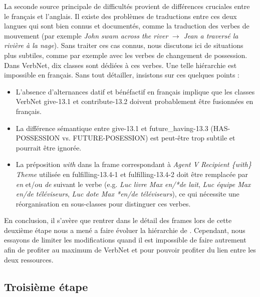 La seconde source principale de difficultés provient de différences cruciales
entre le français et l'anglais. Il existe des problèmes de traductions entre
ces deux langues qui sont bien connus et documentés, comme la traduction des
verbes de mouvement (par exemple \emph{John swam across the river}
$\rightarrow$ \emph{Jean a traversé la rivière à la nage}). Sans traiter ces
cas connus, nous discutons ici de situations plus subtiles, comme par exemple
avec les verbes de changement de possession. Dans VerbNet, dix classes sont
dédiées à ces verbes. Une telle hiérarchie est impossible en français. Sans
tout détailler, insistons sur ces quelques points :

\begin{itemize}

    \item L'absence d'alternances datif et bénéfactif en français implique que
        les classes VerbNet {\color{blue}give-13.1} et
        {\color{blue}contribute-13.2} doivent probablement être fusionnées en
        français.

    \item La différence sémantique entre {\color{blue}give-13.1} et
        {\color{blue}future\_having-13.3} (HAS-POSSESSION vs. FUTURE-POSESSION)
        est peut-être trop subtile et pourrait être ignorée.

    \item La préposition \emph{with} dans la frame correspondant à \emph{Agent
        V Recipient \{with\} Theme} utilisée en {\color{blue}fulfilling-13.4-1}
        et {\color{blue}fulfilling-13.4-2} doit être remplacée par \emph{en}
        et/ou \emph{de} suivant le verbe (e.g. \emph{Luc livre Max en/*de
        lait}, \emph{Luc équipe Max en/de téléviseurs}, \emph{Luc dote Max
        *en/de téléviseurs}), ce qui nécessite une réorganisation en
        sous-classes pour distinguer ces verbes.

\end{itemize}

En conclusion, il s'avère que rentrer dans le détail des frames lors de cette
deuxième étape nous a mené a faire évoluer la hiérarchie de \verbenet{}.
Cependant, nous essayons de limiter les modifications quand il est impossible
de faire autrement afin de profiter au maximum de VerbNet et pour pouvoir
profiter du lien entre les deux ressources.

\subsection{Troisième étape}
\label{third}

